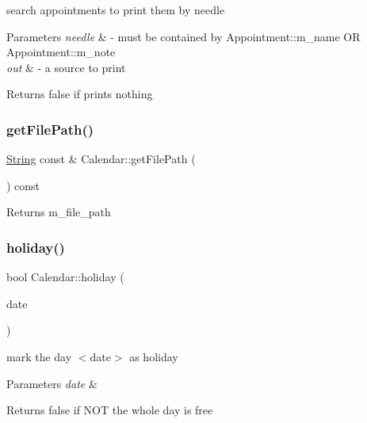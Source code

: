 search appointments to print them by needle 
\begin{DoxyParams}{Parameters}
{\em needle} & -\/ must be contained by Appointment\+::m\+\_\+name OR Appointment\+::m\+\_\+note \\
\hline
{\em out} & -\/ a source to print \\
\hline
\end{DoxyParams}
\begin{DoxyReturn}{Returns}
false if prints nothing 
\end{DoxyReturn}
\mbox{\label{classCalendar_afb5265ef3f8b820048d35dc9921d6789}} 
\subsubsection{\texorpdfstring{get\+File\+Path()}{getFilePath()}}
{\footnotesize\ttfamily \hyperlink{classString}{String} const  \& Calendar\+::get\+File\+Path (\begin{DoxyParamCaption}{ }\end{DoxyParamCaption}) const}

\begin{DoxyReturn}{Returns}
m\+\_\+file\+\_\+path 
\end{DoxyReturn}
\mbox{\label{classCalendar_aa54f943234aebe06350ae6545804dd0a}} 
\subsubsection{\texorpdfstring{holiday()}{holiday()}}
{\footnotesize\ttfamily bool Calendar\+::holiday (\begin{DoxyParamCaption}\item[{\hyperlink{classDate}{Date} const \&}]{date }\end{DoxyParamCaption})}

mark the day $<$date$>$ as holiday 
\begin{DoxyParams}{Parameters}
{\em date} & \\
\hline
\end{DoxyParams}
\begin{DoxyReturn}{Returns}
false if N\+OT the whole day is free 
\end{DoxyReturn}
\mbox{\label{classCalendar_a304110c0454b23f75902ddcddbe8a921}} 

